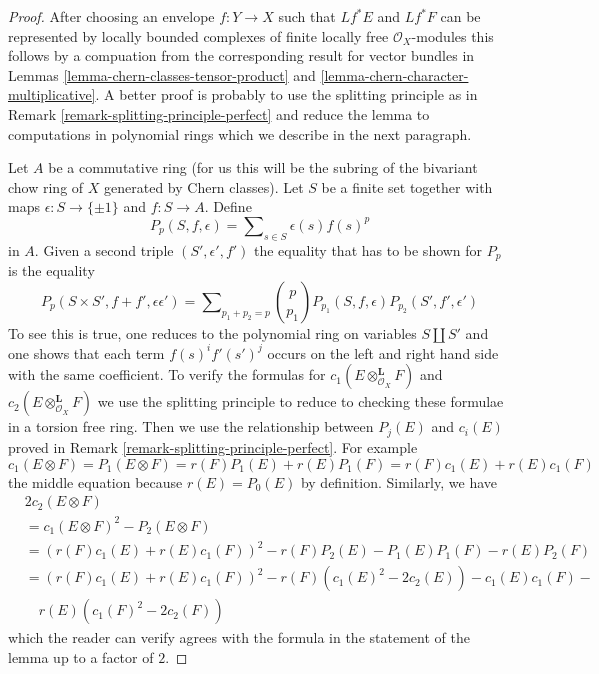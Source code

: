 \begin{proof}
After choosing an envelope $f : Y \to X$ such that $Lf^*E$ and $Lf^*F$
can be represented by locally bounded complexes of finite locally
free $\mathcal{O}_X$-modules this follows by a compuation from the
corresponding result for vector bundles in
Lemmas \ref{lemma-chern-classes-tensor-product} and
\ref{lemma-chern-character-multiplicative}.
A better proof is probably to use the splitting principle as in
Remark \ref{remark-splitting-principle-perfect}
and reduce the lemma to computations in polynomial rings 
which we describe in the next paragraph.

\medskip\noindent
Let $A$ be a commutative ring (for us this will be the subring of the
bivariant chow ring of $X$ generated by Chern classes).
Let $S$ be a finite set together with maps $\epsilon : S \to \{\pm 1\}$
and $f : S \to A$. Define
$$
P_p(S, f , \epsilon) = \sum\nolimits_{s \in S} \epsilon(s) f(s)^p
$$
in $A$. Given a second triple $(S', \epsilon', f')$
the equality that has to be shown for $P_p$ is the equality
$$
P_p(S \times S', f + f' , \epsilon \epsilon') = 
\sum\nolimits_{p_1 + p_2 = p}
{p \choose p_1} P_{p_1}(S, f, \epsilon) P_{p_2}(S', f', \epsilon')
$$
To see this is true, one reduces to the polynomial ring on variables
$S \amalg S'$ and one shows that each term $f(s)^if'(s')^j$ occurs
on the left and right hand side with the same coefficient.
To verify the formulas for $c_1(E \otimes_{\mathcal{O}_X}^\mathbf{L} F)$
and $c_2(E \otimes_{\mathcal{O}_X}^\mathbf{L} F)$ we use the splitting
principle to reduce to checking these formulae in a torsion free ring.
Then we use the relationship between $P_j(E)$ and $c_i(E)$ proved
in Remark \ref{remark-splitting-principle-perfect}. For example
$$
c_1(E \otimes F) = P_1(E \otimes F) = r(F)P_1(E) + r(E)P_1(F) =
r(F)c_1(E) + r(E)c_1(F)
$$
the middle equation because $r(E) = P_0(E)$ by definition. Similarly, we have
\begin{align*}
& 2c_2(E \otimes F) \\
& = c_1(E \otimes F)^2 - P_2(E \otimes F) \\
& =
(r(F)c_1(E) + r(E)c_1(F))^2 -
r(F)P_2(E) - P_1(E)P_1(F) - r(E)P_2(F) \\
& =
(r(F)c_1(E) + r(E)c_1(F))^2 -
r(F)(c_1(E)^2 - 2c_2(E)) - c_1(E)c_1(F) - \\
& \quad r(E)(c_1(F)^2 - 2c_2(F))
\end{align*}
which the reader can verify agrees with the formula in the statement
of the lemma up to a factor of $2$.
\end{proof}







